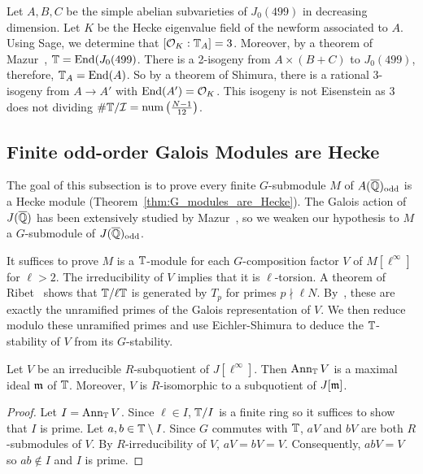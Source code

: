\documentclass{article}
\newcommand{\I}{\mathcal{I}}
\newcommand{\odd}{\mathrm{odd}}
\begin{document}
\begin{example}
    Let $A,B,C$ be the simple abelian subvarieties of $J_0(499)$ in decreasing
    dimension. Let $K$ be the Hecke
    eigenvalue field of the newform associated to $A$. Using Sage, we
    determine that $[\mathcal{O}_K:\mathbb{T}_A]=3$. Moreover, by a theorem of Mazur~\cite{},
    $\mathbb{T}=\operatorname{End}(J_0(499)$. There is a 2-isogeny from $A\times (B+C)$ to
    $J_0(499)$, therefore, $\mathbb{T}_A=\operatorname{End}(A)$. So by a theorem of Shimura, there
    is a rational 3-isogeny from $A\to A'$ with $\operatorname{End}(A')=\mathcal{O}_K$. This isogeny
    is not Eisenstein as $3$ does not dividing $\# \TT/\I = \mathrm{num}
    \left(\frac{N-1}{12}\right)$.
\end{example}

\subsection{Finite odd-order Galois Modules are Hecke}%
\label{sub:finite_odd_order_galois_modules_are_hecke}

The goal of this subsection is to prove every finite $G$-submodule $M$ of
$A(\QQbar)_\odd$ is a Hecke module (Theorem~\ref{thm:G_modules_are_Hecke}).
The Galois action of $J(\overline{\mathbb{Q}})$ has been extensively studied by
Mazur~\cite{mazur:eisenstein}, so we weaken our hypothesis to $M$ a
$G$-submodule of $J(\QQbar)_\odd$. 

It suffices to prove $M$ is a $\mathbb{T}$-module for each $G$-composition factor $V$
of $M[\ell^\infty]$ for $\ell>2$. The irreducibility of $V$ implies that it is
$\ell$-torsion. A theorem of Ribet~\cite[Proposition 2]{ribet:mult_p_finite}
shows that $\mathbb{T}/\ell \mathbb{T}$ is generated by $T_p$ for primes $p\nmid \ell N$.
By~\cite[\S 14]{mazur:eisenstein}, these are exactly the unramified primes of
the Galois representation of $V$. We then reduce modulo these unramified primes
and use Eichler-Shimura to deduce the $\mathbb{T}$-stability of $V$ from its
$G$-stability.

\begin{lemma}\label{lemma:cherry_street}
    Let $V$ be an irreducible $R$-subquotient of $J[\ell^\infty]$. Then
    $\operatorname{Ann}_{\mathbb{T}} V$ is a maximal ideal $\mathfrak{m}$ of $\mathbb{T}$. Moreover, $V$ is
    $R$-isomorphic to a subquotient of $J[\mathfrak{m}]$.
\end{lemma}
\begin{proof}
    Let $I=\operatorname{Ann}_{\mathbb{T}} V$. Since $\ell\in I$, $\mathbb{T}/I$ is a finite ring so it
    suffices to show that $I$ is prime. Let $a,b\in \mathbb{T}\setminus I$. Since $G$
    commutes with $\mathbb{T}$, $aV$ and $bV$ are both $R$-submodules of $V$. By
    $R$-irreducibility of $V$, $aV=bV=V$. Consequently, $abV=V$ so $ab\notin I$
    and $I$ is prime.
\end{proof}
\end{document}
